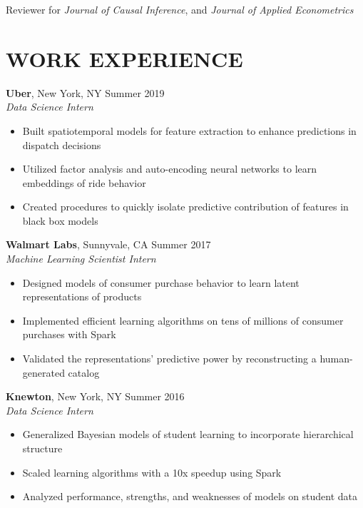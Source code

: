\documentclass{res}
\begin{document}
\begin{resume}
\vskip -8pt
\hspace{0.2em} Reviewer for {\it Journal of Causal Inference}, and {\it Journal of Applied Econometrics}


\section{WORK EXPERIENCE}
\textbf{Uber}, New York, NY \hfill{Summer 2019}\\
\textit{Data Science Intern}
\begin{itemize}
\item Built spatiotemporal models for feature extraction to enhance predictions in dispatch decisions
\item Utilized factor analysis and auto-encoding neural networks to learn embeddings of ride behavior
\item Created procedures to quickly isolate predictive contribution of features in black box  models
\end{itemize}
\vspace{-2mm}  
\textbf{Walmart Labs}, Sunnyvale, CA \hfill{Summer 2017}\\
\textit{Machine Learning Scientist Intern}
\begin{itemize}
\item Designed models of consumer purchase behavior to learn latent representations of products
\item Implemented efficient learning algorithms on tens of millions of consumer purchases with Spark
\item Validated the representations' predictive power by reconstructing a human-generated catalog
\end{itemize}


\textbf{Knewton}, New York, NY \hfill{Summer 2016}\\
\textit{Data Science Intern}
\begin{itemize}
\item Generalized Bayesian models of student learning to incorporate hierarchical structure 
\item Scaled learning algorithms with a 10x speedup using Spark
\item Analyzed performance, strengths, and weaknesses of models on student data
\end{itemize}


\end{resume}
\end{document}
